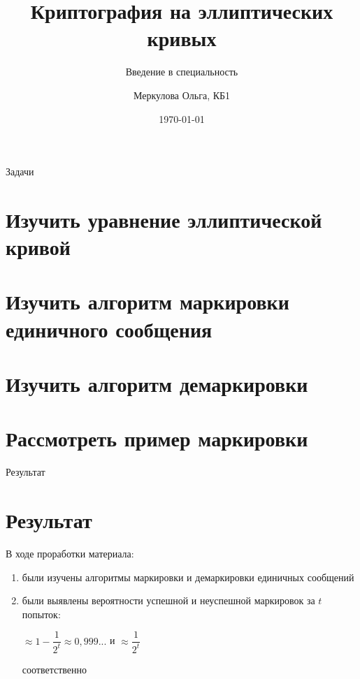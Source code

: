 \documentclass{beamer}
\title{Криптография на эллиптических кривых}
\subtitle{Введение в специальность}
\author{Меркулова Ольга, КБ1}
\institute{БФУ им. Канта}
\date{\today}
\begin{document}
	\begin{frame}
		\titlepage
	\end{frame}

	\begin{frame}{Задачи}
		\section{Изучить уравнение эллиптической кривой}
		\section{Изучить алгоритм маркировки единичного сообщения}
		\section{Изучить алгоритм демаркировки}
		\section{Рассмотреть пример маркировки}
		\tableofcontents
	\end{frame}

	\begin{frame}{Результат}
		\section{Результат}
		В ходе проработки материала:
		\begin{enumerate}
			\item были изучены алгоритмы маркировки и демаркировки единичных сообщений
			\item были выявлены вероятности успешной и неуспешной маркировок за $t$ попыток:
				\begin{center}
					$\approx 1 - \dfrac{1}{2^{t}}\approx 0,999...$ и $\approx \dfrac{1}{2^{t}}$
				\end{center}
			соответственно   
		\end{enumerate}	
	\end{frame}
\end{document}
